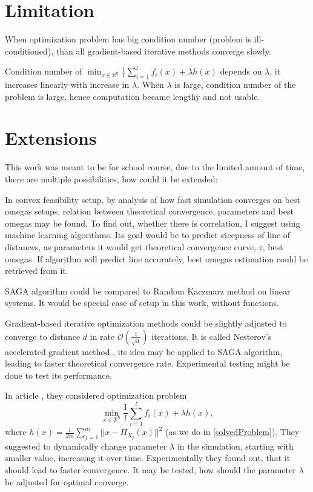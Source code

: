\documentclass[11pt]{book}
\newcommand{\R}{\mathbb{R}}
\theoremstyle{definition}
\begin{document}
	
	\section{Limitation}
	When optimization problem has big condition number (problem is ill-conditioned), than all gradient-based iterative methods converge slowly.
	
	Condition number of $ \min_{x \in \R^n} \frac{1}{l}\sum_{i=1}^l f_i(x) + \lambda h(x)$ depends on $\lambda$, it increases linearly with increase in $\lambda$. When $\lambda$ is large, condition number of the problem is large, hence computation became lengthy and not usable.
	
	\section{Extensions}
	This work was meant to be for school course, due to the limited amount of time, there are multiple possibilities, how could it be extended:
	
	\begin{list}{•}{}
		\item In convex feasibility setup, by analysis of how fast simulation converges on best omegas setups, relation between theoretical convergence, parameters and best omegas may be found. To find out, whether there is correlation, I suggest using machine learning algorithms. Its goal would be to predict steepness of line of distances, as parameters it would get theoretical convergence curve, $\tau$, best omegas. If algorithm will predict line accurately, best omegas estimation could be retrieved from it.
		
		\item SAGA algorithm could be compared to Random Kaczmarz method on linear systems. It would be special case of setup in this work, without functions.
		
		\item Gradient-based iterative optimization methods could be slightly adjusted to converge to distance $d$ in rate $\mathcal{O}(\frac{1}{\sqrt{d}})$ iterations. It is called Nesterov's accelerated gradient method \cite{acceleration}, its idea may be applied to SAGA algorithm, leading to faster theoretical convergence rate. Experimental testing might be done to test its performance.
		
		\item In article \cite{kosto}, they considered optimization problem $$ \min_{x \in \R^n} \frac{1}{l}\sum_{i=1}^l f_i(x) + \lambda h(x),$$ where $h(x)=\frac{1}{2m}\sum_{j=1}^m ||x-\Pi_{X_j}(x)||^2$ (as we do in \ref{solvedProblem}). They suggested to dynamically change parameter $\lambda$ in the simulation, starting with smaller value, increasing it over time. Experimentally they found out, that it should lead to faster convergence. It may be tested, how should the parameter $\lambda$ be adjusted for optimal converge.
	\end{list}
	
	
	
	
\end{document}
